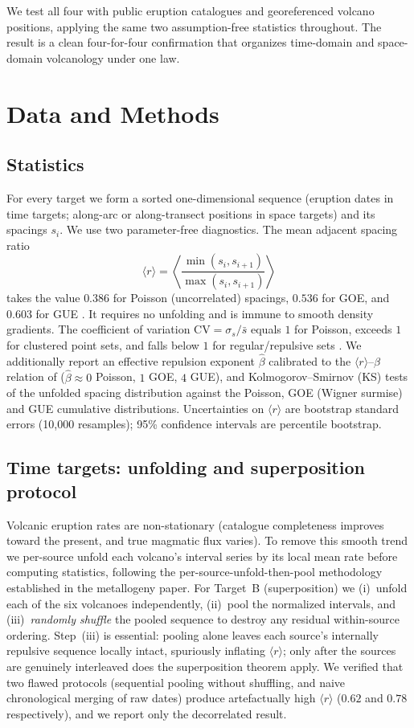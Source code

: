 \documentclass[11pt]{article}
\begin{document}
We test all four with public eruption catalogues and georeferenced volcano
positions, applying the same two assumption-free statistics throughout. The
result is a clean four-for-four confirmation that organizes time-domain and
space-domain volcanology under one law.

\section{Data and Methods}

\subsection{Statistics}
For every target we form a sorted one-dimensional sequence (eruption dates in
time targets; along-arc or along-transect positions in space targets) and its
spacings $s_i$. We use two parameter-free diagnostics. The mean adjacent
spacing ratio
\begin{equation}
\langle r\rangle = \left\langle
\frac{\min(s_i,s_{i+1})}{\max(s_i,s_{i+1})}\right\rangle
\end{equation}
takes the value $0.386$ for Poisson (uncorrelated) spacings, $0.536$ for GOE,
and $0.603$ for GUE \citep{atas2013}. It requires no unfolding and is immune to
smooth density gradients. The coefficient of variation
$\mathrm{CV}=\sigma_s/\bar{s}$ equals $1$ for Poisson, exceeds $1$ for clustered
point sets, and falls below $1$ for regular/repulsive sets \citep{cox1966}. We
additionally report an effective repulsion exponent $\hat\beta$ calibrated to
the $\langle r\rangle$--$\beta$ relation of \citet{atas2013}
($\hat\beta\approx0$ Poisson, $1$ GOE, $4$ GUE), and Kolmogorov--Smirnov (KS)
tests of the unfolded spacing distribution against the Poisson, GOE (Wigner
surmise) and GUE cumulative distributions. Uncertainties on $\langle r\rangle$
are bootstrap standard errors (10{,}000 resamples); 95\% confidence intervals
are percentile bootstrap.

\subsection{Time targets: unfolding and superposition protocol}
Volcanic eruption rates are non-stationary (catalogue completeness improves
toward the present, and true magmatic flux varies). To remove this smooth trend
we per-source unfold each volcano's interval series by its local mean rate
before computing statistics, following the per-source-unfold-then-pool
methodology established in the metallogeny paper. For Target~B (superposition)
we (i)~unfold each of the six volcanoes independently, (ii)~pool the normalized
intervals, and (iii)~\emph{randomly shuffle} the pooled sequence to destroy any
residual within-source ordering. Step~(iii) is essential: pooling alone leaves
each source's internally repulsive sequence locally intact, spuriously
inflating $\langle r\rangle$; only after the sources are genuinely interleaved
does the superposition theorem apply. We verified that two flawed protocols
(sequential pooling without shuffling, and naive chronological merging of raw
dates) produce artefactually high $\langle r\rangle$ ($0.62$ and $0.78$
respectively), and we report only the decorrelated result.
\end{document}

